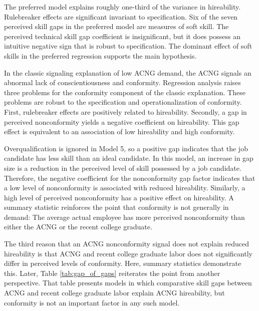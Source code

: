 \documentclass[review]{elsarticle}
\begin{document}
The preferred model explains roughly one-third of the variance in hireability.
Rulebreaker effects are significant invariant to specification.
Six of the seven perceived skill gaps in the preferred model are measures of soft skill.
The perceived technical skill gap coefficient is insignificant, but it does possess an intuitive negative sign that is robust to specification.
The dominant effect of soft skills in the preferred regression supports the main hypothesis.

In the classic signaling explanation of low ACNG demand, the ACNG signals an abnormal lack of conscientiousness and conformity.
Regression analysis raises three problems for the conformity component of the classic explanation.
These problems are robust to the specification and operationalization of conformity.
First, rulebreaker effects are positively related to hireability.
Secondly, a gap in perceived nonconformity yields a negative coefficient on hireability.
This gap effect is equivalent to an association of low hireability and high conformity.

Overqualification is ignored in Model 5, so a positive gap indicates that the job candidate has less skill than an ideal candidate.
In this model, an increase in gap size is a reduction in the perceived level of skill possessed by a job candidate.
Therefore, the negative coefficient for the nonconformity gap factor indicates that a low level of nonconformity is associated with reduced hireability.
Similarly, a high level of perceived nonconformity has a positive effect on hireability.
A summary statistic reinforces the point that conformity is not generally in demand:
The average actual employee has more perceived nonconformity than either the ACNG or the recent college graduate.

The third reason that an ACNG nonconformity signal does not explain reduced hireability is that ACNG
and recent college graduate labor does not significantly differ in perceived levels of conformity.
Here, summary statistics demonstrate this.
Later, Table \ref{tab:gap_of_gaps} reiterates the point from another perspective.
That table presents models in which comparative skill gaps between ACNG and recent college graduate labor explain ACNG hireability,
but conformity is not an important factor in any such model.
\end{document}
